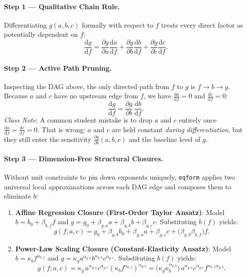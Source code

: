 \documentclass[11pt,a4paper]{article}
\newcommand{\dd}{\mathrm{d}}
\newcommand{\pd}[2]{\frac{\partial #1}{\partial #2}}
\newcommand{\td}[2]{\frac{\dd #1}{\dd #2}}
\begin{document}
\paragraph{Step 1 — Qualitative Chain Rule.}
Differentiating $g(a,b,c)$ formally with respect to $f$ treats every direct factor as potentially dependent on $f$:
\begin{equation}
  \td{g}{f} = \pd{g}{a}\td{a}{f} + \pd{g}{b}\td{b}{f} + \pd{g}{c}\td{c}{f}.
\end{equation}

\paragraph{Step 2 — Active Path Pruning.}
Inspecting the DAG above, the only directed path from $f$ to $g$ is $f \to b \to g$. Because $a$ and $c$ have no upstream edge from $f$, we have $\td{a}{f} = 0$ and $\td{c}{f} = 0$:
\begin{equation}
  \td{g}{f} = \pd{g}{b}\,\td{b}{f}.
\end{equation}
\emph{Class Note}: A common student mistake is to drop $a$ and $c$ entirely once $\td{a}{f} = \td{c}{f} = 0$. That is wrong: $a$ and $c$ are held constant \emph{during differentiation}, but they still enter the sensitivity $\pd{g}{b}(a,b,c)$ and the baseline level of $g$.

\paragraph{Step 3 — Dimension-Free Structural Closures.}
Without unit constraints to pin down exponents uniquely, \texttt{eqform} applies two universal local approximations across each DAG edge and composes them to eliminate $b$:
\begin{enumerate}[leftmargin=1.5em]
  \item \textbf{Affine Regression Closure (First-Order Taylor Ansatz)}: Model $b = b_0 + \beta_{b,f} f$ and $g = g_0 + \beta_{g,a}a + \beta_{g,b}b + \beta_{g,c}c$. Substituting $b(f)$ yields:
  \begin{equation}
    g(f; a, c) = g_0 + \beta_{g,b} b_0 + \beta_{g,a} a + \beta_{g,c} c + \bigl(\beta_{g,b}\beta_{b,f}\bigr) f.
  \end{equation}
  \item \textbf{Power-Law Scaling Closure (Constant-Elasticity Ansatz)}: Model $b = \kappa_b f^{\alpha_{b,f}}$ and $g = \kappa_g a^{\alpha_{g,a}} b^{\alpha_{g,b}} c^{\alpha_{g,c}}$. Substituting $b(f)$ yields:
  \begin{equation}
    g(f; a, c) = \kappa_g\, a^{\alpha_{g,a}} c^{\alpha_{g,c}} \left(\kappa_b f^{\alpha_{b,f}}\right)^{\alpha_{g,b}} = \bigl(\kappa_g \kappa_b^{\alpha_{g,b}}\bigr)\, a^{\alpha_{g,a}} c^{\alpha_{g,c}} f^{\alpha_{b,f}\alpha_{g,b}}.
  \end{equation}
\end{enumerate}
\end{document}
